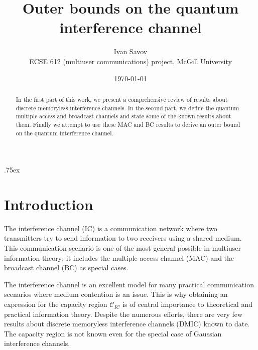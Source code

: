 \documentclass[aps,11pt,twoside,letterpaper]{article}
\newcommand{\ICcap}{  \ensuremath{\mathcal C}_{IC} }
\begin{document}
\title{{\Large Outer bounds on the quantum interference channel} }
\date{\today} 
\author{Ivan Savov \\
    ECSE 612 (multiuser communications) project, McGill University}




\parskip .75ex             %
\maketitle



\begin{abstract}
	In the first part of this work, we present a comprehensive review of
	results about discrete memoryless interference channels.
	In the second part, we define the quantum  multiple access and 
	broadcast channels and state some of the known results about them.
	Finally we attempt to use these MAC and BC results to derive 
	an outer bound on the quantum interference channel. 
\end{abstract}


\section{Introduction}


    The interference channel (IC) is a communication network where two transmitters try to send
    information to two receivers using a shared medium. 
    This communication scenario is one of the most general possible in multiuser information
    theory; it includes the multiple access channel (MAC) and the broadcast channel (BC)
    as special cases.
    
    The interference channel is an excellent model for many practical communication scenarios
    where medium contention is an issue. 
    This is why obtaining an expression for the capacity region $\ICcap$ 
    is of central importance to theoretical and practical information theory.
    Despite the numerous efforts, there are very few results about 
    discrete memoryless interference channels (DMIC) known to date.
    The capacity region is not known even for the special case of Gaussian interference channels.
    
\end{document}

